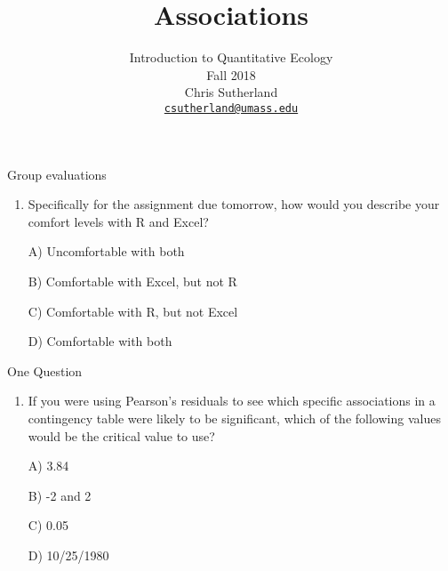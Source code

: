\documentclass[
  ignorenonframetext,
  t]{beamer}
\title{Associations}
\author{Introduction to Quantitative Ecology\\
Fall 2018\\
Chris Sutherland\\
\href{mailto:csutherland@umass.edu}{\nolinkurl{csutherland@umass.edu}}}
\date{}
\providecommand{\tightlist}{%
  \setlength{\itemsep}{0pt}\setlength{\parskip}{0pt}}
\begin{document}
\frame{\titlepage}

\begin{frame}{Group evaluations}
\protect\hypertarget{group-evaluations}{}

\vfill

\begin{enumerate}
\tightlist
\item
  Specifically for the assignment due tomorrow, how would you describe
  your comfort levels with R and Excel?
\end{enumerate}

\begin{enumerate}[\hspace{0.5cm}A.]
  \item[A)] Uncomfortable with both
  \item[B)] Comfortable with Excel, but not R
  \item[C)] Comfortable with R, but not Excel
  \item[D)] Comfortable with both
\end{enumerate}


\vfill

\end{frame}

\begin{frame}{One Question}
\protect\hypertarget{one-question}{}

\vfill

\begin{enumerate}
\tightlist
\item
  If you were using Pearson's residuals to see which specific
  associations in a contingency table were likely to be significant,
  which of the following values would be the critical value to use?
\end{enumerate}

\begin{enumerate}[\hspace{0.5cm}A.]
  \item[A)] 3.84
  \item[B)] -2 and 2
  \item[C)] 0.05
  \item[D)] 10/25/1980
\end{enumerate}

\vfill


\end{frame}
\end{document}

